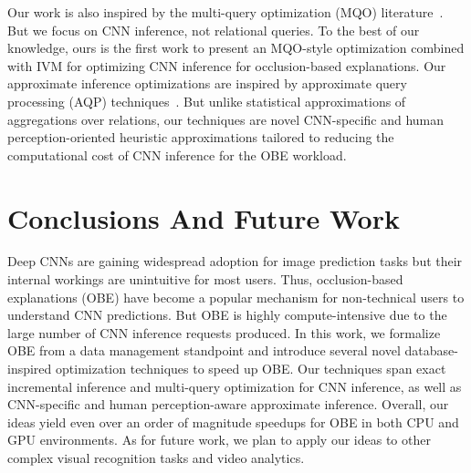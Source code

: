 \documentclass[10pt, sigconf]{acmart}
\begin{document}
Our work is also inspired by the multi-query optimization (MQO) literature~\cite{sellis1988multiple,le2012scalable}. But we focus on CNN inference, not relational queries. To the best of our knowledge, ours is the first work to present an MQO-style optimization combined with IVM for optimizing CNN inference for occlusion-based explanations.
Our approximate inference optimizations are inspired by approximate query processing (AQP) techniques~\cite{park2018verdictdb,garofalakis2001approximate}. But unlike statistical approximations of aggregations over relations, our techniques are novel CNN-specific and human perception-oriented heuristic approximations tailored to reducing the computational cost of CNN inference for the OBE workload.



\section{Conclusions And Future Work}
Deep CNNs are gaining widespread adoption for image prediction tasks but their internal workings are unintuitive for most users. Thus, occlusion-based explanations (OBE) have become a popular mechanism for non-technical users to understand CNN predictions. But OBE is highly compute-intensive due to the large number of CNN inference requests produced. In this work, we formalize OBE from a data management standpoint and introduce several novel database-inspired optimization techniques to speed up OBE. Our techniques span exact incremental inference and multi-query optimization for CNN inference, as well as CNN-specific and human perception-aware approximate inference. Overall, our ideas yield even over an order of magnitude speedups for OBE in both CPU and GPU environments.
As for future work, we plan to apply our ideas to other complex visual recognition tasks and video analytics.
\end{document}
